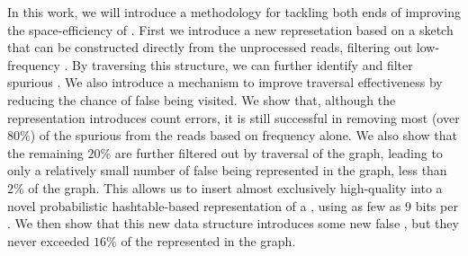 In this work, we will introduce a methodology for tackling both ends of improving the space-efficiency of \dBG. First we introduce a new represetation based on a \cm sketch \cite{Cormode2005} that can be constructed directly from the unprocessed reads, filtering out low-frequency . By traversing this structure, we can further identify and filter spurious . We also introduce a mechanism to improve traversal effectiveness by reducing the chance of false  being visited. We show that, although the  representation introduces count errors, it is still successful in removing most (over $80\%$) of the spurious  from the reads based on frequency alone. We also show that the remaining $20\%$ are further filtered out by traversal of the graph, leading to only a relatively small number of false  being represented in the graph, less than $2\%$ of the graph. This allows us to insert almost exclusively high-quality  into a novel probabilistic hashtable-based representation of a \dBG, using as few as $9$ bits per \kmer. We then show that this new data structure introduces some new false , but they never exceeded $16\%$ of the  represented in the graph.